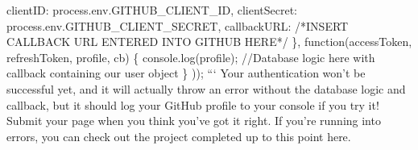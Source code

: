 \documentclass{article}%
\begin{document}
  clientID: process.env.GITHUB\_CLIENT\_ID,\newline%
  clientSecret: process.env.GITHUB\_CLIENT\_SECRET,\newline%
  callbackURL: /*INSERT CALLBACK URL ENTERED INTO GITHUB HERE*/\newline%
\},\newline%
  function(accessToken, refreshToken, profile, cb) \{\newline%
    console.log(profile);\newline%
    //Database logic here with callback containing our user object\newline%
  \}\newline%
));\newline%
```\newline%
Your authentication won't be successful yet, and it will actually throw an error without the database logic and callback, but it should log your GitHub profile to your console if you try it!\newline%
Submit your page when you think you've got it right. If you're running into errors, you can check out the project completed up to this point here.\newline%

%
\end{document}
